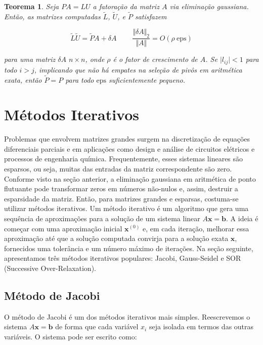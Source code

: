 \documentclass{article}
\theoremstyle{plain}
\newtheorem{thm}{Teorema}[section]
\theoremstyle{definition}
\theoremstyle{remark}
\begin{document}
\begin{thm}\label{thm:fator_crescimento}
  Seja \(PA = LU\) a fatoração da matriz \(A\) via eliminação gaussiana. Então, as matrizes computadas \(\tilde{L}\), \(\tilde{U}\), e \(\tilde{P}\) satisfazem

  \begin{equation}\label{eq:fator_crescimento}
    \tilde{L}\tilde{U} = \tilde{P}A + \delta A\ \qquad \frac{\Vert \delta A \Vert_2}{\Vert A \Vert} = O(\rho \ \text{eps})
  \end{equation}

  \noindent para uma matriz \(\delta A\) \(n \times n\), onde \(\rho\) é o fator de crescimento de \(A\). Se \(\vert l_{ij} \vert < 1\) para todo \(i > j\), implicando que não há empates na seleção de pivôs em aritmética exata, então \(\tilde{P} = P\) para todo \(\text{eps}\) suficientemente pequeno.
\end{thm}

\newpage
\section{Métodos Iterativos}

Problemas que envolvem matrizes grandes surgem na discretização de equações diferenciais parciais e em aplicações como design e análise de circuitos elétricos e processos de engenharia química. Frequentemente, esses sistemas lineares são esparsos, ou seja, muitas das entradas da matriz correspondente são zero. Conforme visto na seção anterior, a eliminação gaussiana em aritmética de ponto flutuante pode transformar zeros em números não-nulos e, assim, destruir a esparsidade da matriz. Então, para matrizes grandes e esparsas, costuma-se utilizar métodos iterativos. Um método iterativo é um algoritmo que gera uma sequência de aproximações para a solução de um sistema linear \(A\mathbf{x} = \mathbf{b}\). A ideia é começar com uma aproximação inicial \(\mathbf{x}^{(0)}\) e, em cada iteração, melhorar essa aproximação até que a solução computada convirja para a solução exata \(\mathbf{x}\), fornecidos uma tolerância e um número máximo de iterações. Na seção seguinte, apresentamos três métodos iterativos populares: Jacobi, Gauss-Seidel e SOR (Successive Over-Relaxation).

\subsection{Método de Jacobi}

O método de Jacobi é um dos métodos iterativos mais simples. Reescrevemos o sistema \(A\mathbf{x} = \mathbf{b}\) de forma que cada variável \(x_i\) seja isolada em termos das outras variáveis. O sistema pode ser escrito como:
\end{document}
